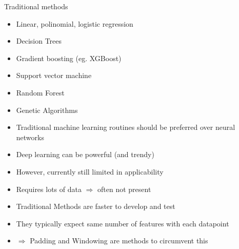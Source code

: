 %
%
\begin{frame}{\insertsubsection}
    Traditional methods
    \begin{itemize}[<+->]
        \item Linear, polinomial, logistic regression
        \item Decision Trees
        \item[] Gradient boosting (eg. XGBoost)
        \item Support vector machine
        \item Random Forest
        \item Genetic Algorithms
    \end{itemize}
\end{frame}
%
%
\begin{frame}{\insertsubsection}
    \begin{itemize}
        \item Traditional machine learning routines should be preferred over neural networks
        \item Deep learning can be powerful (and trendy)
        \item[] However, currently still limited in applicability
        \item[] Requires lots of data $\Rightarrow$ often not present
        \item Traditional Methods are faster to develop and test
        \item[] They typically expect same number of features with each datapoint
        \item[] $\Rightarrow$ Padding and Windowing are methods to circumvent this
    \end{itemize}
\end{frame}
%
%
